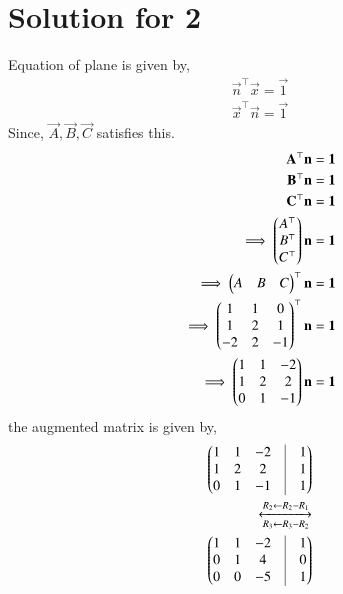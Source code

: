\documentclass[A4,10pt,twocolumn]{IEEEtran}
\begin{document}
\section{Solution for 2}
Equation of plane is given by,
\begin{align}
\vec{n}^\top \vec{x} =\vec{1}\\
\vec{x}^\top \vec{n}=\vec{1}
\end{align}
Since, $\vec{A}, \vec{B}, \vec{C}$ satisfies this.
\begin{align}
\mathbf{A}^\top \mathbf{n}=\mathbf{1}\\
  \mathbf{B}^\top \mathbf{n}=\mathbf{1}\\
 \mathbf{C}^\top \mathbf{n}=\mathbf{1}\\
\implies \begin{pmatrix}A^\top\\B^\top\\C^\top\end{pmatrix}  \mathbf{n} = \mathbf{1}\\
\implies \begin{pmatrix}A&B&C\end{pmatrix}^\top\mathbf{n}=\mathbf{1}\\
\implies \begin{pmatrix}1&1&0 \\ 1&2&1 \\ -2&2&-1\end{pmatrix} ^\top \mathbf{n}=\mathbf{1}\\
\implies \begin{pmatrix}1&1&-2\\1&2&2\\0&1&-1\end{pmatrix}\mathbf{n}=\mathbf{1}
\end{align}
the augmented matrix is given by,
\begin{align}
\myvec{1&1&-2&\vrule&1\\1&2&2&\vrule&1\\0&1&-1&\vrule&1}\\
\xleftrightarrow[R_3 \leftarrow R_3 - R_2]{R_2 \leftarrow R_2 - R_1}\\
\myvec{1&1&-2&\vrule&1\\0&1&4&\vrule&0\\0&0&-5&\vrule&1}
\end{align}
\end{document}
